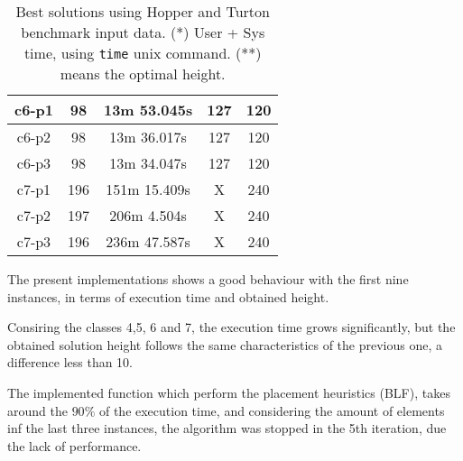 \begin{table}[h!t]
\begin{tabular}{|c|c|c|c|c|}
        c6-p1             & 98                & 13m 53.045s   & 127             & 120                 \\ \hline
        c6-p2             & 98                & 13m 36.017s   & 127             & 120                 \\ \hline
        c6-p3             & 98                & 13m 34.047s   & 127             & 120                 \\ \hline
        c7-p1             & 196               & 151m 15.409s  & X             & 240                 \\ \hline
        c7-p2             & 197               & 206m 4.504s   & X             & 240                 \\ \hline
        c7-p3             & 196               & 236m 47.587s  & X             & 240                 \\ \hline
    \end{tabular}
    \label{tab:results}
    \caption{Best solutions using Hopper and Turton benchmark input 
data. (*) User + Sys time, using \texttt{time} unix command. (**) means the optimal height.}
\end{table}

The present implementations shows a good behaviour with the first nine
instances, in terms of execution time and obtained height.

Consiring the classes 4,5, 6 and 7,
the execution time grows significantly,
but the obtained solution height follows the same characteristics
of the previous one, a difference less than 10.

The implemented function which perform the placement heuristics (BLF),
takes around the $90\%$ of the execution time, and considering the amount of
elements inf the last three instances, the algorithm was stopped in the 5th iteration,
due the lack of performance.
